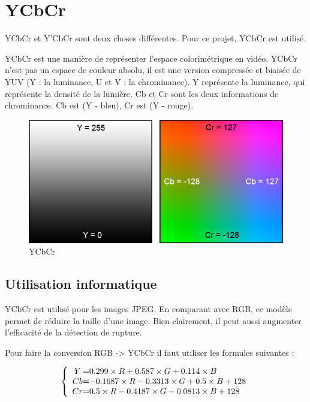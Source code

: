 \section{YCbCr}

YCbCr et Y’CbCr sont deux choses différentes. Pour ce projet, YCbCr est utilisé.

YCbCr est une manière de représenter l’espace colorimétrique en vidéo. YCbCr n’est pas un espace de couleur absolu, il est une version compressée et biaisée de YUV (Y : la luminance, U et V : la chrominance). Y représente la luminance, qui représente la densité de la lumière. Cb et Cr sont les deux informations de chrominance. Cb est (Y - bleu), Cr est (Y - rouge).

\begin{figure}[h!]
      \centering
      \includegraphics[scale=0.6]{images/YCbCr.png}
      \caption{\label{YCbCr}YCbCr}
\end{figure}


\subsection{Utilisation informatique}
YCbCr est utilisé pour les images JPEG. En comparant avec RGB, ce modèle permet de réduire la taille d’une image. Bien clairement, il peut aussi augmenter l’efficacité de la détection de rupture.

Pour faire la conversion RGB -> YCbCr il faut utiliser les formules suivantes :

\[
 \left \{
 \begin{array}{c @{=} l}
	Y & 0.299 \times R + 0.587 \times G + 0.114 \times B \\
	Cb & -0.1687 \times R - 0.3313 \times G + 0.5 \times B + 128 \\
	Cr & 0.5 \times R - 0.4187 \times G - 0.0813 \times B + 128 \\
 \end{array}
 \right.
\]

